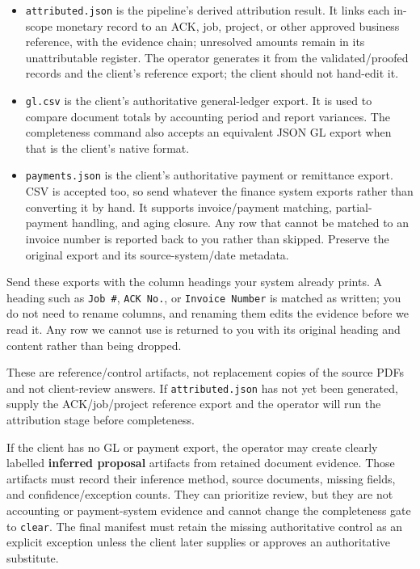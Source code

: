 \documentclass[
]{article}
\providecommand{\tightlist}{%
  \setlength{\itemsep}{0pt}\setlength{\parskip}{0pt}}
\begin{document}
\begin{itemize}
\tightlist
\item
  \texttt{attributed.json} is the pipeline's derived attribution result.
  It links each in-scope monetary record to an ACK, job, project, or
  other approved business reference, with the evidence chain; unresolved
  amounts remain in its unattributable register. The operator generates
  it from the validated/proofed records and the client's reference
  export; the client should not hand-edit it.
\item
  \texttt{gl.csv} is the client's authoritative general-ledger export.
  It is used to compare document totals by accounting period and report
  variances. The completeness command also accepts an equivalent JSON GL
  export when that is the client's native format.
\item
  \texttt{payments.json} is the client's authoritative payment or
  remittance export. CSV is accepted too, so send whatever the finance
  system exports rather than converting it by hand. It supports
  invoice/payment matching, partial-payment handling, and aging closure.
  Any row that cannot be matched to an invoice number is reported back
  to you rather than skipped. Preserve the original export and its
  source-system/date metadata.
\end{itemize}

Send these exports with the column headings your system already prints.
A heading such as \texttt{Job\ \#}, \texttt{ACK\ No.}, or
\texttt{Invoice\ Number} is matched as written; you do not need to
rename columns, and renaming them edits the evidence before we read it.
Any row we cannot use is returned to you with its original heading and
content rather than being dropped.

These are reference/control artifacts, not replacement copies of the
source PDFs and not client-review answers. If \texttt{attributed.json}
has not yet been generated, supply the ACK/job/project reference export
and the operator will run the attribution stage before completeness.

If the client has no GL or payment export, the operator may create
clearly labelled \textbf{inferred proposal} artifacts from retained
document evidence. Those artifacts must record their inference method,
source documents, missing fields, and confidence/exception counts. They
can prioritize review, but they are not accounting or payment-system
evidence and cannot change the completeness gate to \texttt{clear}. The
final manifest must retain the missing authoritative control as an
explicit exception unless the client later supplies or approves an
authoritative substitute.
\end{document}

